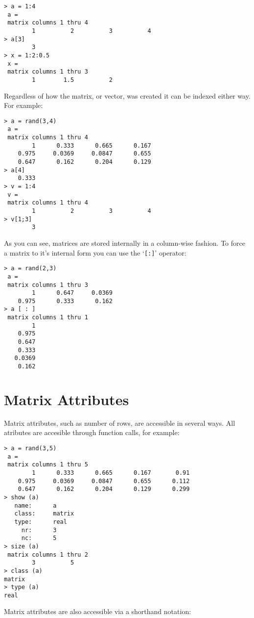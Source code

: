 \begin{verbatim}
> a = 1:4
 a =
 matrix columns 1 thru 4
        1          2          3          4  
> a[3]
        3
> x = 1:2:0.5
 x =
 matrix columns 1 thru 3
        1        1.5          2  
\end{verbatim}

   Regardless of how the matrix, or vector,  was created it can be
   indexed either way. For example:

\begin{verbatim}
> a = rand(3,4)
 a =
 matrix columns 1 thru 4
        1      0.333      0.665      0.167  
    0.975     0.0369     0.0847      0.655  
    0.647      0.162      0.204      0.129  
> a[4]
    0.333
> v = 1:4
 v =
 matrix columns 1 thru 4
        1          2          3          4  
> v[1;3]
        3
\end{verbatim}

   As you can see, matrices are stored internally in a column-wise
   fashion. To force a matrix to it's internal form you can use the
   `\verb+[:]+' operator:

\begin{verbatim}
> a = rand(2,3)
 a =
 matrix columns 1 thru 3
        1      0.647     0.0369  
    0.975      0.333      0.162  
> a [ : ]
 matrix columns 1 thru 1
        1  
    0.975  
    0.647  
    0.333  
   0.0369  
    0.162  
\end{verbatim}

\section{Matrix Attributes}

   Matrix attributes, such as number of rows, are accessible in
   several ways. All atributes are accesible through function calls,
   for example:

\begin{verbatim}
> a = rand(3,5)
 a =
 matrix columns 1 thru 5
        1      0.333      0.665      0.167       0.91  
    0.975     0.0369     0.0847      0.655      0.112  
    0.647      0.162      0.204      0.129      0.299  
> show (a)
   name:      a       
   class:     matrix  
   type:      real    
     nr:      3       
     nc:      5       
> size (a)
 matrix columns 1 thru 2
        3          5  
> class (a)
matrix
> type (a)
real
\end{verbatim}

   Matrix attributes are also accessible via a shorthand notation:

